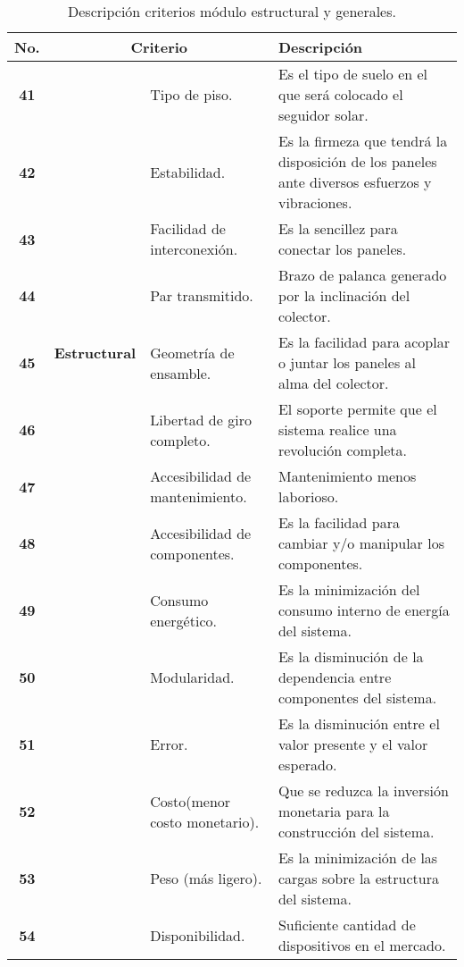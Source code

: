 \begin{table}[H]
	\centering
	\small
	\caption{Descripción criterios módulo estructural y generales.}
	\begin{tabular}{|c|c|p{10em}|p{21em}|}
		\hline
		\multicolumn{1}{|p{1.715em}|}{\textbf{No.}} & \multicolumn{2}{p{8em}|}{\textbf{Criterio}} & \textbf{Descripción} \\
		\hline
		\hline
		\textbf{41} & \multicolumn{1}{c|}{\multirow{9}[50]{*}{\begin{sideways}\textbf{Estructural}\end{sideways}}} & Tipo de piso. & Es el tipo de suelo en el que será colocado el seguidor solar. \\
		\cline{1-1}\cline{3-4}    \textbf{42} &       & Estabilidad. & Es la firmeza que tendrá la disposición de los paneles ante diversos esfuerzos y vibraciones. \\
		\cline{1-1}\cline{3-4}    \textbf{43} &       & Facilidad de interconexión. & Es la sencillez para conectar los paneles. \\
		\cline{1-1}\cline{3-4}    \textbf{44} &       & Par transmitido. &  Brazo de palanca generado por la inclinación del colector. \\
		\cline{1-1}\cline{3-4}    \textbf{45} &       & Geometría de ensamble. & Es la facilidad para acoplar o juntar los paneles al alma del colector. \\
		\cline{1-1}\cline{3-4}    \textbf{46} &       & Libertad de giro completo. & El soporte permite que el sistema realice una revolución completa. \\
		\cline{1-1}\cline{3-4}    \textbf{47} &       & Accesibilidad de mantenimiento. & Mantenimiento menos laborioso. \\
		\cline{1-1}\cline{3-4}    \textbf{48} &       & Accesibilidad de componentes. & Es la facilidad para cambiar y/o manipular los componentes. \\
		\hline
		\textbf{49} & \multicolumn{1}{c|}{\multirow{6}[34]{*}{\begin{sideways}\textbf{Generales}\end{sideways}}} & Consumo energético. & Es la minimización del consumo interno de energía del sistema. \\
		\cline{1-1}\cline{3-4}    \textbf{50} &       & Modularidad. & Es la disminución de la dependencia entre componentes del sistema. \\
		\cline{1-1}\cline{3-4}    \textbf{51} &       & Error. & Es la disminución entre el valor presente y el valor esperado. \\
		\cline{1-1}\cline{3-4}    \textbf{52} &       & Costo(menor costo monetario). & Que se reduzca la inversión monetaria para la construcción del sistema. \\
		\cline{1-1}\cline{3-4}    \textbf{53} &       & Peso (más ligero). & Es la minimización de las cargas sobre la estructura del sistema. \\
		\cline{1-1}\cline{3-4}    \textbf{54} &       & Disponibilidad. & Suficiente cantidad de dispositivos en el mercado. \\
		\hline
	\end{tabular}%
	\label{tab:addlabel4}%
\end{table}%

\bigskip
\endinput 
